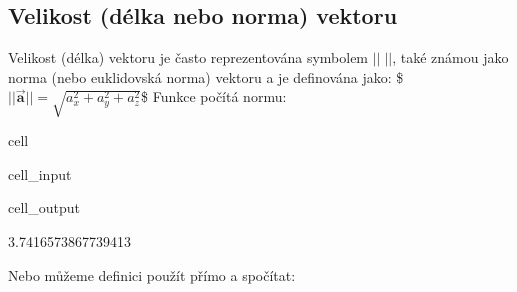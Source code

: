 \documentclass[letterpaper,10pt,english]{jupyterBook}
\begin{document}
\subsection{Velikost (délka nebo norma) vektoru}
\label{\detokenize{Prednasky/0_2_Skal_xe1ry_a_vektory:velikost-delka-nebo-norma-vektoru}}
\sphinxAtStartPar
Velikost (délka) vektoru je často reprezentována symbolem \( || \; || \), také známou jako norma (nebo euklidovská norma) vektoru a je definována jako:
\$\( ||\overrightarrow{\mathbf{a}}|| = \sqrt{a_x^2+a_y^2+a_z^2} \)\$
Funkce  počítá normu:

\begin{sphinxuseclass}{cell}\begin{sphinxVerbatimInput}

\begin{sphinxuseclass}{cell_input}
\begin{sphinxVerbatim}[commandchars=\\\{\}]
  \PYG{p}{[}  \PYG{p}{]}
\end{sphinxVerbatim}

\end{sphinxuseclass}\end{sphinxVerbatimInput}
\begin{sphinxVerbatimOutput}

\begin{sphinxuseclass}{cell_output}
\begin{sphinxVerbatim}[commandchars=\\\{\}]
3.7416573867739413
\end{sphinxVerbatim}

\end{sphinxuseclass}\end{sphinxVerbatimOutput}

\end{sphinxuseclass}
\sphinxAtStartPar
Nebo můžeme definici použít přímo a spočítat:
\end{document}
